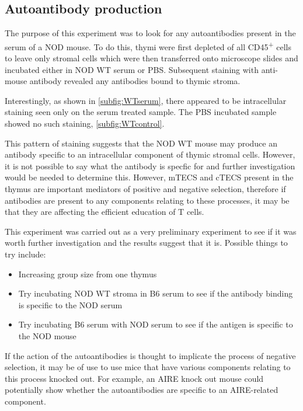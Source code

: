 \subsection{Autoantibody production}


The purpose of this experiment was to look for any autoantibodies present in the serum of a NOD mouse.
To do this, thymi were first depleted of all CD45\textsuperscript{+} cells to leave only stromal cells which were then transferred onto microscope slides and incubated either in NOD WT serum or PBS.
Subsequent staining with anti-mouse antibody revealed any antibodies bound to thymic stroma.

Interestingly, as shown in \cref{subfig:WTserum}, there appeared to be intracellular staining seen only on the serum treated sample.
The PBS incubated sample showed no such staining, \cref{subfig:WTcontrol}.

This pattern of staining suggests that the NOD WT mouse may produce an antibody specific to an intracellular component of thymic stromal cells.
However, it is not possible to say what the antibody is specfic for and further investigation would be needed to determine this.
However, mTECS and cTECS present in the thymus are important mediators of positive and negative selection, therefore if antibodies are present to any components relating to these processes, it may be that they are affecting the efficient education of T cells.

This experiment was carried out as a very preliminary experiment to see if it was worth further investigation and the results suggest that it is.
Possible things to try include:
\begin{itemize}
\item Increasing group size from one thymus
\item Try incubating NOD WT stroma in B6 serum to see if the antibody binding is specific to the NOD serum
\item Try incubating B6 serum with NOD serum to see if the antigen is specific to the NOD mouse
\end{itemize}

If the action of the autoantibodies is thought to implicate the process of negative selection, it may be of use to use mice that have various components relating to this process knocked out.
For example, an AIRE knock out mouse could potentially show whether the autoantibodies are specific to an AIRE-related component.


